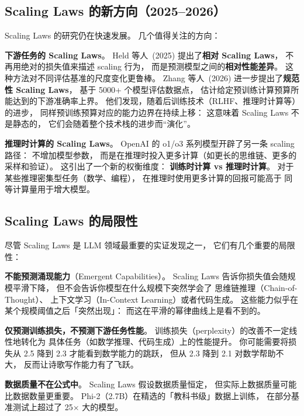 \subsection{Scaling Laws 的新方向（2025--2026）}

Scaling Laws 的研究仍在快速发展。
几个值得关注的方向：

\textbf{下游任务的 Scaling Laws}。
Held 等人~(2025) 提出了\textbf{相对 Scaling Laws}，%
不再用绝对的损失值来描述 scaling 行为，
而是预测模型之间的\textbf{相对性能差异}。
这种方法对不同评估基准的尺度变化更鲁棒。
Zhang 等人~(2026) 进一步提出了\textbf{规范性 Scaling Laws}，%
基于 5000+ 个模型评估数据点，
估计给定预训练计算预算所能达到的下游准确率上界。
他们发现，随着后训练技术（RLHF、推理时计算等）的进步，
同样预训练预算对应的能力边界在持续上移：
这意味着 Scaling Laws 不是静态的，
它们会随着整个技术栈的进步而“演化”。

\textbf{推理时计算的 Scaling Laws}。
OpenAI 的 o1/o3 系列模型开辟了另一条 scaling 路径：
不增加模型参数，
而是在推理时投入更多计算（如更长的思维链、更多的采样和验证）。
这引出了一个新的权衡维度：
\textbf{训练时计算 vs 推理时计算}。
对于某些推理密集型任务（数学、编程），
在推理时使用更多计算的回报可能高于
同等计算量用于增大模型。

\subsection{Scaling Laws 的局限性}

尽管 Scaling Laws 是 LLM 领域最重要的实证发现之一，
它们有几个重要的局限性：

\textbf{不能预测涌现能力}（Emergent Capabilities）。
Scaling Laws 告诉你损失值会随规模平滑下降，
但不会告诉你模型在什么规模下突然学会了
思维链推理（Chain-of-Thought）、
上下文学习（In-Context Learning）或者代码生成。
这些能力似乎在某个规模阈值之后「突然出现」：
而这在平滑的幂律曲线上是看不到的。

\textbf{仅预测训练损失，不预测下游任务性能}。
训练损失（perplexity）的改善不一定线性地转化为
具体任务（如数学推理、代码生成）上的性能提升。
你可能需要将损失从 2.5 降到 2.3 才能看到数学能力的跳跃，
但从 2.3 降到 2.1 对数学帮助不大，
反而让诗歌写作能力有了飞跃。

\textbf{数据质量不在公式中}。
Scaling Laws 假设数据质量恒定，
但实际上数据质量可能比数据数量更重要。
Phi-2（2.7B）在精选的「教科书级」数据上训练，
在部分基准测试上超过了 25$\times$ 大的模型。


